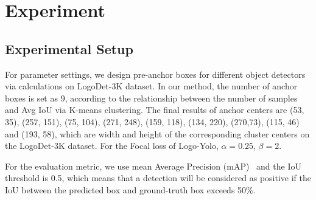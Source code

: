 \documentclass[journal]{IEEEtran}
\begin{document}
\section{Experiment}
\subsection{Experimental Setup}
For parameter settings, we design pre-anchor boxes for different object detectors via calculations on LogoDet-3K dataset. In our method, the number of anchor boxes is set as 9, according to the relationship between the number of samples and Avg IoU via K-means clustering. The final results of anchor centers are (53, 35), (257, 151), (75, 104), (271, 248), (159, 118), (134, 220), (270,73), (115, 46) and (193, 58), which are width and height of the corresponding cluster centers on the LogoDet-3K dataset. For the Focal loss of Logo-Yolo, $\alpha=0.25$, $\beta=2$. 

For the evaluation metric, we use mean Average Precision (mAP)~\cite{Everingham2010voc} and the IoU threshold is 0.5, which means that a detection will be considered as positive if the IoU between the predicted box and ground-truth box exceeds 50\%. 
\begin{table} [!t]
	\caption{Statistics of three benchmarks.}
	\label{dataset comparison}
\centering
\end{table}
\begin{table} [!t]
	\caption{Statistics of three super-classes.}
	\label{super-classes comparison}
\centering
\end{table}
\end{document}
